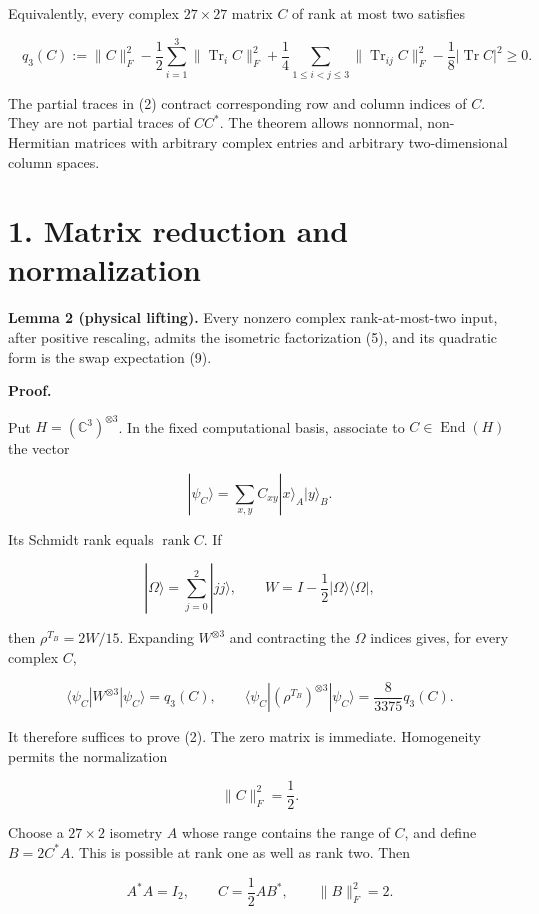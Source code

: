 \documentclass[
  11pt,
]{article}
\begin{document}
Equivalently, every complex \(27\times27\) matrix \(C\) of rank at most
two satisfies

\[
\boxed{\quad
q_3(C):=\|C\|_F^2
-\frac12\sum_{i=1}^3\|\operatorname{Tr}_i C\|_F^2
+\frac14\sum_{1\leq i<j\leq3}\|\operatorname{Tr}_{ij}C\|_F^2
-\frac18|\operatorname{Tr}C|^2\geq0.
\quad}
\tag{2}
\]

The partial traces in (2) contract corresponding row and column indices
of \(C\). They are not partial traces of \(CC^*\). The theorem allows
nonnormal, non-Hermitian matrices with arbitrary complex entries and
arbitrary two-dimensional column spaces.

\section{1. Matrix reduction and
normalization}\label{matrix-reduction-and-normalization}

\textbf{Lemma 2 (physical lifting).} Every nonzero complex
rank-at-most-two input, after positive rescaling, admits the isometric
factorization (5), and its quadratic form is the swap expectation (9).

\textbf{Proof.}

Put \(H=(\mathbb C^3)^{\otimes3}\). In the fixed computational basis,
associate to \(C\in\operatorname{End}(H)\) the vector

\[
|\psi_C\rangle=\sum_{x,y}C_{xy}|x\rangle_A|y\rangle_B.
\]

Its Schmidt rank equals \(\operatorname{rank}C\). If

\[
|\Omega\rangle=\sum_{j=0}^2|jj\rangle,\qquad
W=I-\frac12|\Omega\rangle\langle\Omega|,
\]

then \(\rho^{T_B}=2W/15\). Expanding \(W^{\otimes3}\) and contracting
the \(\Omega\) indices gives, for every complex \(C\),

\[
\langle\psi_C|W^{\otimes3}|\psi_C\rangle=q_3(C),\qquad
\langle\psi_C|(\rho^{T_B})^{\otimes3}|\psi_C\rangle
=\frac8{3375}q_3(C).
\tag{3}
\]

It therefore suffices to prove (2). The zero matrix is immediate.
Homogeneity permits the normalization

\[
\|C\|_F^2=\frac12.
\tag{4}
\]

Choose a \(27\times2\) isometry \(A\) whose range contains the range of
\(C\), and define \(B=2C^*A\). This is possible at rank one as well as
rank two. Then

\[
A^*A=I_2,\qquad C=\frac12AB^*,\qquad \|B\|_F^2=2.
\tag{5}
\]
\end{document}
